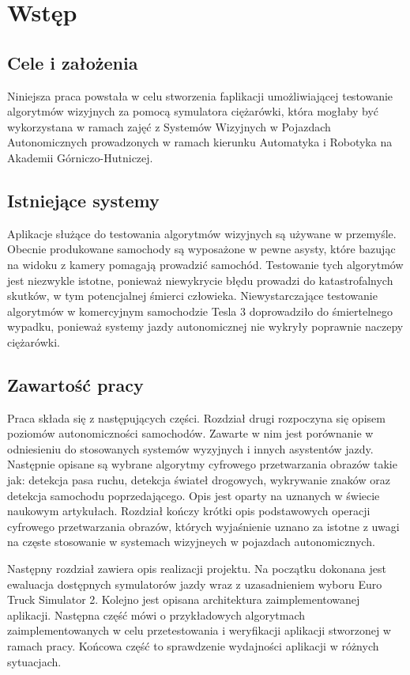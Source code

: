 \chapter{Wstęp}
\section{Cele i założenia}
Niniejsza praca powstała w celu stworzenia faplikacji umożliwiającej testowanie algorytmów wizyjnych za pomocą symulatora ciężarówki, która mogłaby być wykorzystana w ramach zajęć z Systemów Wizyjnych w Pojazdach Autonomicznych prowadzonych w ramach kierunku Automatyka i Robotyka na Akademii Górniczo-Hutniczej.

\section{Istniejące systemy}
Aplikacje służące do testowania algorytmów wizyjnych są używane w przemyśle. Obecnie produkowane samochody są wyposażone w pewne asysty, które bazując na widoku z kamery pomagają prowadzić samochód. Testowanie tych algorytmów jest niezwykle istotne, ponieważ niewykrycie błędu prowadzi do katastrofalnych skutków, w tym potencjalnej śmierci człowieka. Niewystarczające testowanie algorytmów w komercyjnym samochodzie Tesla 3 doprowadziło do śmiertelnego wypadku, ponieważ systemy jazdy autonomicznej nie wykryły poprawnie naczepy ciężarówki.

\section{Zawartość pracy}

Praca składa się z następujących części. Rozdział drugi rozpoczyna się opisem poziomów autonomiczności samochodów. Zawarte w nim jest porównanie w odniesieniu do stosowanych systemów wyzyjnych i innych asystentów jazdy. Następnie opisane są wybrane algorytmy cyfrowego przetwarzania obrazów takie jak: detekcja pasa ruchu, detekcja świateł drogowych, wykrywanie znaków oraz detekcja samochodu poprzedającego. Opis jest oparty na uznanych w świecie naukowym artykułach. Rozdział kończy krótki opis podstawowych operacji cyfrowego przetwarzania obrazów, których wyjaśnienie uznano za istotne z uwagi na częste stosowanie w systemach wizyjneych w pojazdach autonomicznych.

Następny rozdział zawiera opis realizacji projektu. Na początku dokonana jest ewaluacja dostępnych symulatorów jazdy wraz z uzasadnieniem wyboru Euro Truck Simulator 2. Kolejno jest opisana architektura zaimplementowanej aplikacji. Następna część mówi o przykładowych algorytmach zaimplementowanych w celu przetestowania i weryfikacji aplikacji stworzonej w ramach pracy. Końcowa część to sprawdzenie wydajności aplikacji w różnych sytuacjach.

